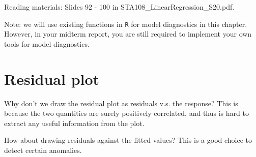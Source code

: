 \documentclass[12pt,]{book}
\newenvironment{Shaded}{\begin{snugshade}}{\end{snugshade}}
\newcommand{\KeywordTok}[1]{\textcolor[rgb]{0.13,0.29,0.53}{\textbf{#1}}}
\newcommand{\DataTypeTok}[1]{\textcolor[rgb]{0.13,0.29,0.53}{#1}}
\newcommand{\DecValTok}[1]{\textcolor[rgb]{0.00,0.00,0.81}{#1}}
\newcommand{\StringTok}[1]{\textcolor[rgb]{0.31,0.60,0.02}{#1}}
\newcommand{\CommentTok}[1]{\textcolor[rgb]{0.56,0.35,0.01}{\textit{#1}}}
\newcommand{\OperatorTok}[1]{\textcolor[rgb]{0.81,0.36,0.00}{\textbf{#1}}}
\newcommand{\NormalTok}[1]{#1}
\begin{document}
Reading materials: Slides 92 - 100 in STA108\_LinearRegression\_S20.pdf.

Note: we will use existing functions in \texttt{R} for model diagnostics
in this chapter. However, in your midterm report, you are still required
to implement your own tools for model diagnostics.

\section{Residual plot}\label{residual-plot}

\begin{Shaded}
\end{Shaded}

Why don't we draw the residual plot as residuals v.s. the response? This
is because the two quantities are surely positively correlated, and thus
is hard to extract any useful information from the plot.

\begin{Shaded}
\end{Shaded}

How about drawing residuals against the fitted values? This is a good
choice to detect certain anomalies.
\end{document}
